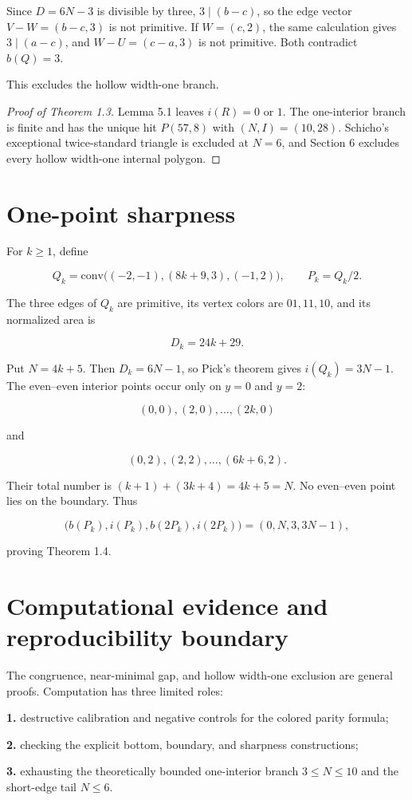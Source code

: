 \documentclass[11pt]{article}
\theoremstyle{remark}
\numberwithin{equation}{section}
\begin{document}
Since $D=6N-3$ is divisible by three, $3\mid(b-c)$, so the edge vector $V-W=(b-c,3)$ is not primitive. If $W=(c,2)$, the same calculation gives $3\mid(a-c)$, and $W-U=(c-a,3)$ is not primitive. Both contradict $b(Q)=3$.

This excludes the hollow width-one branch.

\begin{proof}[Proof of Theorem 1.3]

Lemma 5.1 leaves $i(R)=0$ or $1$. The one-interior branch is finite and has the unique hit $P(57,8)$ with $(N,I)=(10,28)$. Schicho's exceptional twice-standard triangle is excluded at $N=6$, and Section 6 excludes every hollow width-one internal polygon.
\end{proof}


\section{One-point sharpness}


For $k\ge1$, define

\[
Q_k=\mathrm{conv}\bigl((-2,-1),(8k+9,3),(-1,2)\bigr),\qquad P_k=Q_k/2.
\]

The three edges of $Q_k$ are primitive, its vertex colors are $01,11,10$, and its normalized area is

\[
D_k=24k+29.
\]

Put $N=4k+5$. Then $D_k=6N-1$, so Pick's theorem gives $i(Q_k)=3N-1$. The even--even interior points occur only on $y=0$ and $y=2$:

\[
(0,0),(2,0),\ldots,(2k,0)
\]

and

\[
(0,2),(2,2),\ldots,(6k+6,2).
\]

Their total number is $(k+1)+(3k+4)=4k+5=N$. No even--even point lies on the boundary. Thus

\[
\bigl(b(P_k),i(P_k),b(2P_k),i(2P_k)\bigr)
=(0,N,3,3N-1),
\]

proving Theorem 1.4.

\section{Computational evidence and reproducibility boundary}


The congruence, near-minimal gap, and hollow width-one exclusion are general proofs. Computation has three limited roles:

\par\noindent\textbf{1.} destructive calibration and negative controls for the colored parity formula;
\par\noindent\textbf{2.} checking the explicit bottom, boundary, and sharpness constructions;
\par\noindent\textbf{3.} exhausting the theoretically bounded one-interior branch $3\le N\le10$ and the short-edge tail $N\le6$.
\end{document}
